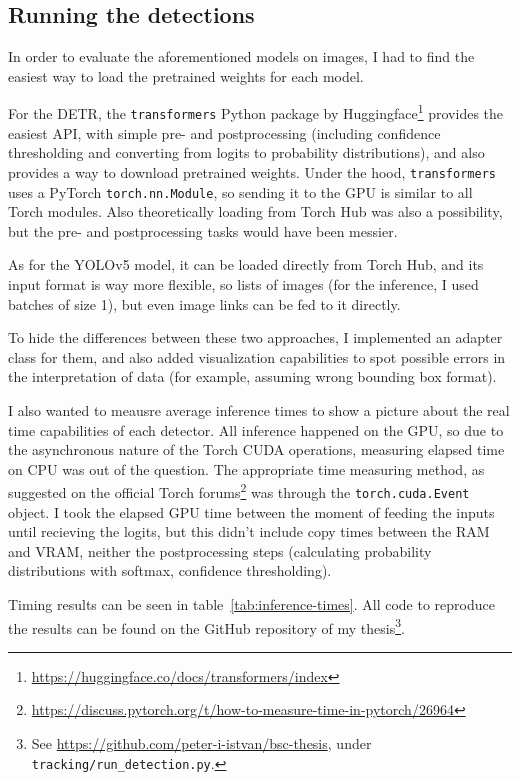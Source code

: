 \subsection{Running the detections}

In order to evaluate the aforementioned models on images, I had to find the easiest way to load the pretrained weights for each model.

For the DETR, the \verb|transformers| Python package by Huggingface\footnote{\url{https://huggingface.co/docs/transformers/index}} provides the easiest API, with simple pre- and postprocessing (including confidence thresholding and converting from logits to probability distributions), and also provides a way to download pretrained weights. Under the hood, \verb|transformers| uses a PyTorch \verb|torch.nn.Module|, so sending it to the GPU is similar to all Torch modules. Also theoretically loading from Torch Hub was also a possibility, but the pre- and postprocessing tasks would have been messier.

As for the YOLOv5 model, it can be loaded directly from Torch Hub, and its input format is way more flexible, so lists of images (for the inference, I used batches of size 1), but even image links can  be fed to it directly.

To hide the differences between these two approaches, I implemented an adapter class for them, and also added visualization capabilities to spot possible errors in the interpretation of data (for example, assuming wrong bounding box format).

I also wanted to meausre average inference times to show a picture about the real time capabilities of each detector. All inference happened on the GPU, so due to the asynchronous nature of the Torch CUDA operations, measuring elapsed time on CPU was out of the question. The appropriate time measuring method, as suggested on the official Torch forums\footnote{\url{https://discuss.pytorch.org/t/how-to-measure-time-in-pytorch/26964}} was through the \verb|torch.cuda.Event| object. I took the elapsed GPU time between the moment of feeding the inputs until recieving the logits, but this didn't include copy times between the RAM and VRAM, neither the postprocessing steps (calculating probability distributions with softmax, confidence thresholding).

Timing results can be seen in table~\ref{tab:inference-times}. All code to reproduce the results can be found on the GitHub repository of my thesis\footnote{
    See \url{https://github.com/peter-i-istvan/bsc-thesis}, under \texttt{tracking/run\_detection.py}.
}.

